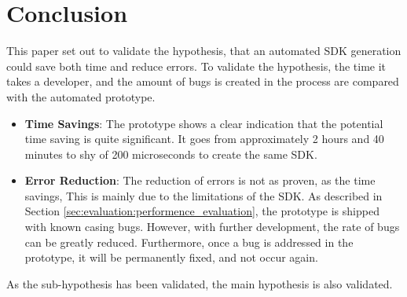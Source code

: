 \section{Conclusion}
This paper set out to validate the hypothesis, that an automated SDK generation could save both time and reduce errors. 
To validate the hypothesis, the time it takes a developer, and the amount of bugs is created in the process are compared with the automated prototype.
\begin{itemize}
    \item \textbf{Time Savings}: The prototype shows a clear indication that the potential time saving is quite significant. It goes from approximately 2 hours and 40 minutes to shy of 200 microseconds to create the same SDK.
    \item \textbf{Error Reduction}: The reduction of errors is not as proven, as the time savings, This is mainly due to the limitations of the SDK. As described in Section \ref{sec:evaluation:performence_evaluation}, the prototype is shipped with known casing bugs. However, with further development, the rate of bugs can be greatly reduced. Furthermore, once a bug is addressed in the prototype, it will be permanently fixed, and not occur again.
\end{itemize}
\noindent
As the sub-hypothesis has been validated, the main hypothesis is also validated.